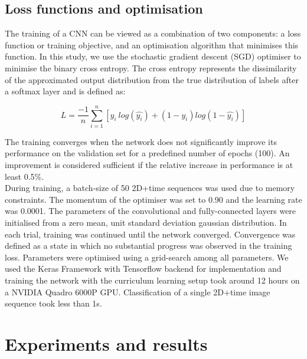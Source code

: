 \documentclass[preprint,12pt,authoryear]{elsarticle}
\begin{document}
\subsection{Loss functions and optimisation}
\label{sec:implementationdetails}

The training of a CNN can be viewed as a combination of two components: a loss function or training objective, and an optimisation algorithm that minimises this function. In this study, we use the stochastic gradient descent (SGD) optimiser  to minimise the binary cross entropy. The cross entropy represents the dissimilarity of the approximated output distribution from the true distribution of labels after a softmax layer and is defined as:


$$L= \dfrac{-1}{n} \sum_{i=1}^n  [y_{i}~log(\hat{y_{i}}) + (1-y_i)log(1-\hat{y_i}) ] $$


The training converges when the network does not significantly improve its performance on the validation set for a predefined number of epochs (100). An improvement is considered sufficient if the relative increase in performance is at least 0.5\%.  \\

During training, a batch-size of 50 2D+time sequences was used due to memory constraints. The  momentum of the optimiser was set to 0.90 and the learning rate was 0.0001. The parameters of the convolutional and fully-connected layers were initialised from a zero mean, unit standard deviation gaussian distribution. In each trial, training was continued until the network converged. Convergence was defined as a state in which no substantial progress was observed in the training loss. Parameters were optimised using a grid-search among all parameters. We used the Keras Framework with Tensorflow backend for implementation and training the network with the curriculum learning setup took around 12 hours on a NVIDIA Quadro 6000P GPU. Classification of a single 2D+time image  sequence took less than 1s.

\section{Experiments and results}
\label{sec:experiments_results}
\end{document}

